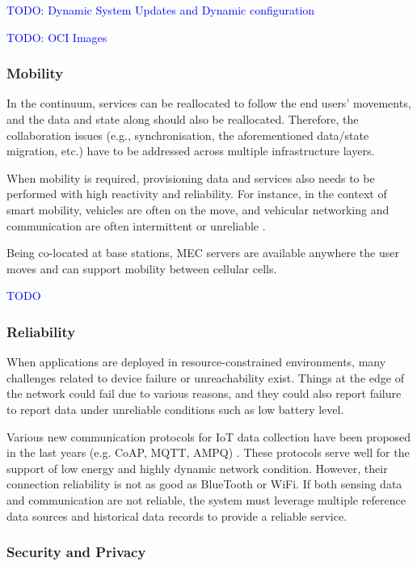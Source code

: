 \documentclass{ieeeaccess}
\begin{document}
\textcolor{blue}{TODO: Dynamic System Updates and Dynamic configuration}

\textcolor{blue}{TODO: OCI Images}

\subsubsection{Mobility}

In the continuum, services can be reallocated to follow the end users' movements, and the data and state along should also be reallocated. Therefore, the collaboration issues (e.g., synchronisation, the aforementioned data/state migration, etc.) have to be addressed across multiple infrastructure layers.

When mobility is required, provisioning data and services also needs to be performed with high reactivity and reliability. For instance, in the context of smart mobility, vehicles are often on the move, and vehicular networking and communication are often intermittent or unreliable \cite{vehicular-data-cloud}.

Being co-located at base stations, MEC servers are available anywhere the user moves and can support mobility between cellular cells.

\textcolor{blue}{TODO}

\subsubsection{Reliability}

When applications are deployed in resource-constrained environments, many challenges related to device failure or unreachability exist. Things at the edge of the network could fail due to various reasons, and they could also report failure to report data under unreliable conditions such as low battery level.

Various new communication protocols for IoT data collection have been proposed in the last years (e.g. CoAP, MQTT, AMPQ) \cite{mqtt-coap-amqp-http}. These protocols serve well for the support of low energy and highly dynamic network condition. However, their connection reliability is not as good as BlueTooth or WiFi. If both sensing data and communication are not reliable, the system must leverage multiple reference data sources and historical data records to provide a reliable service.

\subsubsection{Security and Privacy}
\end{document}

